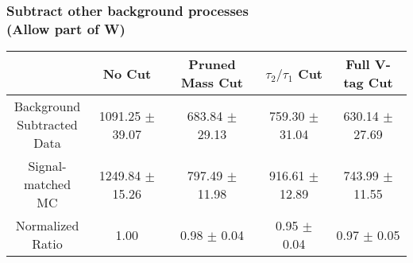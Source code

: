 \documentclass{beamer}
\begin{document}
\begin{frame}
  \frametitle{Subtract other background processes \\ (Allow part of W)}
  \begin{adjustwidth}{-1.5em}{-1.5em}
    \centering
    {\scriptsize
      \begin{tabular}{| c | c | c | c | c |}
        \hline
        & No Cut & Pruned Mass Cut & $\tau_2/\tau_1$ Cut & Full V-tag Cut \\
        \hline
        \makecell{Background \\ Subtracted \\ Data} & 1091.25 $\pm$ 39.07 & 683.84 $\pm$ 29.13 & 759.30 $\pm$ 31.04 & 630.14 $\pm$ 27.69 \\
        \makecell{Signal-\\ matched MC} & 1249.84 $\pm$ 15.26 & 797.49 $\pm$ 11.98 & 916.61 $\pm$ 12.89 & 743.99 $\pm$ 11.55 \\
        \hline
        \makecell{Normalized \\ Ratio} & 1.00 & 0.98 $\pm$ 0.04 & 0.95 $\pm$ 0.04 & 0.97 $\pm$ 0.05 \\
        \hline
      \end{tabular}
    }
  \end{adjustwidth}
\end{frame}
\end{document}
